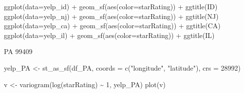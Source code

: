 \documentclass[
  12pt,
  letterpaper,
  DIV=11,
  numbers=noendperiod]{scrartcl}
\newenvironment{Shaded}{\begin{snugshade}}{\end{snugshade}}
\newcommand{\AttributeTok}[1]{\textcolor[rgb]{0.98,0.46,0.51}{#1}}
\newcommand{\DecValTok}[1]{\textcolor[rgb]{0.47,0.72,1.00}{#1}}
\newcommand{\FunctionTok}[1]{\textcolor[rgb]{0.70,0.57,0.94}{#1}}
\newcommand{\NormalTok}[1]{\textcolor[rgb]{0.88,0.89,0.91}{#1}}
\newcommand{\OtherTok}[1]{\textcolor[rgb]{0.70,0.57,0.94}{#1}}
\newcommand{\SpecialCharTok}[1]{\textcolor[rgb]{0.47,0.72,1.00}{#1}}
\newcommand{\StringTok}[1]{\textcolor[rgb]{0.62,0.80,1.00}{#1}}
\begin{document}
\begin{Shaded}
\begin{Highlighting}[]
\FunctionTok{ggplot}\NormalTok{(}\AttributeTok{data=}\NormalTok{yelp\_id) }\SpecialCharTok{+} \FunctionTok{geom\_sf}\NormalTok{(}\FunctionTok{aes}\NormalTok{(}\AttributeTok{color=}\NormalTok{starRating)) }\SpecialCharTok{+} \FunctionTok{ggtitle}\NormalTok{(}\StringTok{\textquotesingle{}ID\textquotesingle{}}\NormalTok{)}
\FunctionTok{ggplot}\NormalTok{(}\AttributeTok{data=}\NormalTok{yelp\_nj) }\SpecialCharTok{+} \FunctionTok{geom\_sf}\NormalTok{(}\FunctionTok{aes}\NormalTok{(}\AttributeTok{color=}\NormalTok{starRating)) }\SpecialCharTok{+} \FunctionTok{ggtitle}\NormalTok{(}\StringTok{\textquotesingle{}NJ\textquotesingle{}}\NormalTok{)}
\FunctionTok{ggplot}\NormalTok{(}\AttributeTok{data=}\NormalTok{yelp\_ca) }\SpecialCharTok{+} \FunctionTok{geom\_sf}\NormalTok{(}\FunctionTok{aes}\NormalTok{(}\AttributeTok{color=}\NormalTok{starRating)) }\SpecialCharTok{+} \FunctionTok{ggtitle}\NormalTok{(}\StringTok{\textquotesingle{}CA\textquotesingle{}}\NormalTok{)}
\FunctionTok{ggplot}\NormalTok{(}\AttributeTok{data=}\NormalTok{yelp\_il) }\SpecialCharTok{+} \FunctionTok{geom\_sf}\NormalTok{(}\FunctionTok{aes}\NormalTok{(}\AttributeTok{color=}\NormalTok{starRating)) }\SpecialCharTok{+} \FunctionTok{ggtitle}\NormalTok{(}\StringTok{\textquotesingle{}IL\textquotesingle{}}\NormalTok{)}
\end{Highlighting}
\end{Shaded}

PA 99409

\begin{Shaded}
\begin{Highlighting}[]
\NormalTok{yelp\_PA }\OtherTok{\textless{}{-}} \FunctionTok{st\_as\_sf}\NormalTok{(df\_PA, }\AttributeTok{coords =} \FunctionTok{c}\NormalTok{(}\StringTok{"longitude"}\NormalTok{, }\StringTok{"latitude"}\NormalTok{), }\AttributeTok{crs =} \DecValTok{28992}\NormalTok{)}
\end{Highlighting}
\end{Shaded}

\begin{Shaded}
\begin{Highlighting}[]
\NormalTok{v }\OtherTok{\textless{}{-}} \FunctionTok{variogram}\NormalTok{(}\FunctionTok{log}\NormalTok{(starRating) }\SpecialCharTok{\textasciitilde{}} \DecValTok{1}\NormalTok{, yelp\_PA)}
\FunctionTok{plot}\NormalTok{(v)}
\end{Highlighting}
\end{Shaded}
\end{document}
